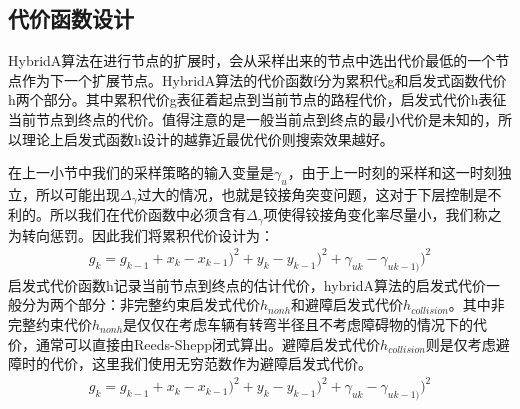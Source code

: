 \documentclass[master,academic]{ysuthesis} %
\begin{document}
		\subsection{代价函数设计}
		HybridA算法在进行节点的扩展时，会从采样出来的节点中选出代价最低的一个节点作为下一个扩展节点。HybridA算法的代价函数f分为累积代g和启发式函数代价h两个部分。其中累积代价g表征着起点到当前节点的路程代价，启发式代价h表征当前节点到终点的代价。值得注意的是一般当前点到终点的最小代价是未知的，所以理论上启发式函数h设计的越靠近最优代价则搜索效果越好。
		
		在上一小节中我们的采样策略的输入变量是$\gamma_u$，由于上一时刻的采样和这一时刻独立，所以可能出现$\Delta_{\gamma}$过大的情况，也就是铰接角突变问题，这对于下层控制是不利的。所以我们在代价函数中必须含有$\Delta_{\gamma}$项使得铰接角变化率尽量小，我们称之为转向惩罚。因此我们将累积代价设计为：
		\begin{equation}
			\begin{aligned}
				g_k=g_{k-1}+ x_k-x_{k-1} ) ^2+ y_k-y_{k-1} ) ^2+ \gamma _{uk}-\gamma _{u k-1 )} ) ^2
			\end{aligned}
		\end{equation}
		启发式代价函数h记录当前节点到终点的估计代价，hybridA算法的启发式代价一般分为两个部分：非完整约束启发式代价$h_{nonh}$和避障启发式代价$h_{collision}$。其中非完整约束代价$h_{nonh}$是仅仅在考虑车辆有转弯半径且不考虑障碍物的情况下的代价，通常可以直接由Reeds-Shepp闭式算出。避障启发式代价$h_{collision}$则是仅考虑避障时的代价，这里我们使用无穷范数作为避障启发式代价。
		\begin{equation}
			\begin{aligned}
				g_k=g_{k-1}+ x_k-x_{k-1} ) ^2+ y_k-y_{k-1} ) ^2+ \gamma _{uk}-\gamma _{u k-1 )} ) ^2
			\end{aligned}
		\end{equation}
\end{document}
